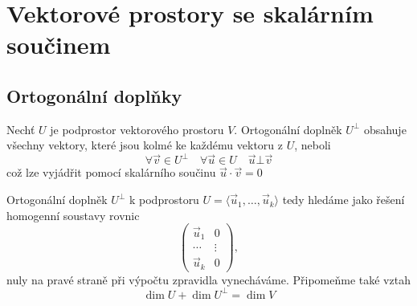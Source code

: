   \section{Vektorové prostory se skalárním součinem}
    \subsection{Ortogonální doplňky}
      Nechť $U$ je podprostor vektorového prostoru $V$. Ortogonální doplněk $U^\bot$ obsahuje všechny
      vektory, které jsou kolmé ke každému vektoru z $U$, neboli $$\forall\vec{v}\in U^\bot\quad
      \forall\vec{u}\in U\quad \vec{u}\bot\vec{v}$$ což lze vyjádřit pomocí skalárního součinu
      $\vec{u}\cdot\vec{v} = 0$
  
      Ortogonální doplněk $U^\bot$ k podprostoru $U = \langle\vec{u}_1,\ldots,\vec{u}_k\rangle$ tedy
      hledáme jako řešení homogenní soustavy rovnic
      \begin{equation*}
        \left(
          \begin{array}{c|c}
             \vec{u}_1  &   0      \\
             \cdots     &  \vdots  \\
             \vec{u}_k  &   0
          \end{array}
        \right),
      \end{equation*}
      nuly na pravé straně při výpočtu zpravidla vynecháváme. Připomeňme také vztah
      \begin{equation}\label{LA:eq_dim_doplnek}
         \dim U + \dim U^\bot = \dim V
      \end{equation}
  

